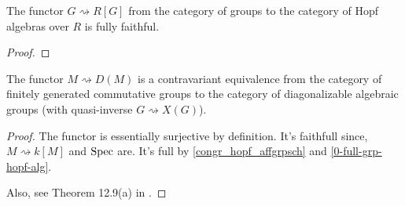 \begin{proposition}
  \label{0-full-grp-hopf-alg}
  \uses{}

  The functor $G \rightsquigarrow R[G]$ from the category of groups to the category of Hopf algebras over $R$ is fully faithful.
\end{proposition}
\begin{proof}

\end{proof}


\begin{theorem}
  \label{0-fg-comm-grp-equiv-diag-grp-sch}
  The functor $M\rightsquigarrow D(M)$ is a contravariant equivalence
  from the category of finitely generated commutative groups to the category of
  diagonalizable algebraic groups (with quasi-inverse $G \rightsquigarrow X(G)$).
\end{theorem}
\begin{proof}

  The functor is essentially surjective by definition.
  It's faithfull since, $M\rightsquigarrow k[M]$ and $\operatorname{Spec}$ are.
  It's full by \ref{congr_hopf_affgrpsch} and \ref{0-full-grp-hopf-alg}.

  Also, see Theorem 12.9(a) in \cite{Milne_2017}.
\end{proof}

